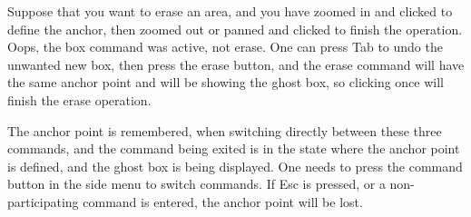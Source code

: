 Suppose that you want to erase an area, and you have zoomed in and
clicked to define the anchor, then zoomed out or panned and clicked to
finish the operation.  Oops, the {\cb box} command was active, not
{\cb erase}.  One can press {\kb Tab} to undo the unwanted new box,
then press the {\cb erase} button, and the {\cb erase} command will
have the same anchor point and will be showing the ghost box, so
clicking once will finish the erase operation.

The anchor point is remembered, when switching directly between these
three commands, and the command being exited is in the state where the
anchor point is defined, and the ghost box is being displayed.  One
needs to press the command button in the side menu to switch commands. 
If {\kb Esc} is pressed, or a non-participating command is entered,
the anchor point will be lost.

